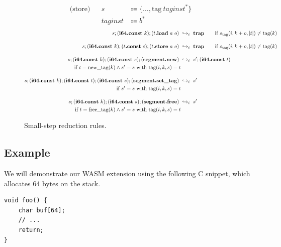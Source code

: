 \begin{figure}[t]
    \begin{align*}
        \text{(store)} && s &\Coloneqq \{\dots, \text{tag}\ \mathit{taginst}^*\} \\
        && \mathit{taginst} &\Coloneqq b^*
    \end{align*}
    \begin{align*}
        s;(\textbf{i64.const}\ k);(t\textbf{.load}\ a\ o)\ &\hookrightarrow_i\ \textbf{trap} \tag*{$\text{if}\ s_\text{tag}(i, k + o,\lvert t \rvert) \neq \text{tag}(k)$} \\[1em]
        s;(\textbf{i64.const}\ k);(t\textbf{.const}\ c);(t\textbf{.store}\ a\ o)\ &\hookrightarrow_i\ \textbf{trap} \tag*{$\text{if}\ s_\text{tag}(i, k + o,\lvert t \rvert) \neq \text{tag}(k)$} \\[1em]
        s;(\textbf{i64.const}\ k);(\textbf{i64.const}\ s);(\textbf{segment.new})\ &\hookrightarrow_i\ s';(\textbf{i64.const}\ t) \notag\\
        \tag*{$\text{if}\ t = \text{new\_tag}(k) \land s' = s\ \text{with}\ \text{tag}(i, k, s) = t$} \\[1em]
        s;(\textbf{i64.const}\ k);(\textbf{i64.const}\ t);(\textbf{i64.const}\ s);(\textbf{segment.set\_tag})\ &\hookrightarrow_i\ s' \notag\\
        \tag*{$\text{if}\ s' = s\ \text{with}\ \text{tag}(i, k, s) = t$} \\[1em]
        s;(\textbf{i64.const}\ k);(\textbf{i64.const}\ s);(\textbf{segment.free})\ &\hookrightarrow_i\ s' \notag\\
        \tag*{$\text{if}\ t = \text{free\_tag}(k) \land s' = s\ \text{with}\ \text{tag}(i, k, s) = t$}
    \end{align*}
    \caption{Small-step reduction rules.}
    \label{fig:smallstep-rules}
\end{figure}


\subsection{Example}
\label{subsec:example}

We will demonstrate our \ac{WASM} extension using the following C snippet, which allocates 64 bytes on the stack.
\begin{lstlisting}[frame=h,style=customc,
    label={lst:wasm-example-c}]
void foo() {
    char buf[64];
    // ...
    return;
}
\end{lstlisting}

